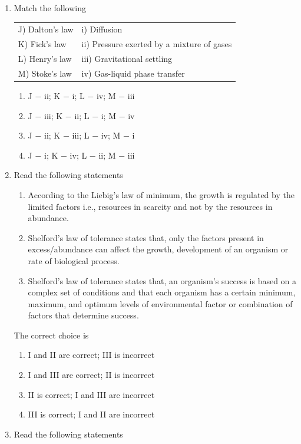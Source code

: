 \documentclass[journal,12pt,onecolumn]{IEEEtran}
\theoremstyle{remark}
\begin{document}
\begin{enumerate}
\item Match the following

\begin{tabular}{ll}
J) Dalton's law & i) Diffusion \\
K) Fick's law & ii) Pressure exerted by a mixture of gases \\
L) Henry's law & iii) Gravitational settling \\
M) Stoke's law & iv) Gas-liquid phase transfer \\
\end{tabular}

\begin{enumerate}
\item J $-$ ii; K $-$ i; L $-$ iv; M $-$ iii
\item J $-$ iii; K $-$ ii; L $-$ i; M $-$ iv
\item J $-$ ii; K $-$ iii; L $-$ iv; M $-$ i
\item J $-$ i; K $-$ iv; L $-$ ii; M $-$ iii
\end{enumerate}
\hfill{}
\item Read the following statements

\begin{enumerate}[label=\Roman*.]
\item According to the Liebig's law of minimum, the growth is regulated by the limited factors i.e., resources in scarcity and not by the resources in abundance.
\item Shelford's law of tolerance states that, only the factors present in excess/abundance can affect the growth, development of an organism or rate of biological process.
\item Shelford's law of tolerance states that, an organism's success is based on a complex set of conditions and that each organism has a certain minimum, maximum, and optimum levels of environmental factor or combination of factors that determine success.
\end{enumerate}

The correct choice is

\begin{enumerate}
\item I and II are correct; III is incorrect
\item I and III are correct; II is incorrect
\item II is correct; I and III are incorrect
\item III is correct; I and II are incorrect
\end{enumerate}
\hfill{}
\item Read the following statements


\end{enumerate}
\end{document}
